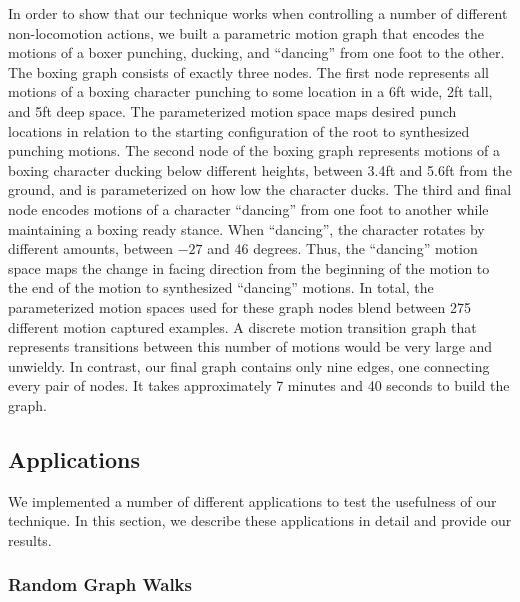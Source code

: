 \documentclass[10pt,twocolumn]{article}
\begin{document}
In order to show that our technique works when controlling a number of different non-locomotion actions, we built a parametric motion graph that encodes the motions of a boxer punching, ducking, and ``dancing'' from one foot to the other. The boxing graph consists of exactly three nodes. The first node represents all motions of a boxing character punching to some location in a 6ft wide, 2ft tall, and 5ft deep space. The parameterized motion space maps desired punch locations in relation to the starting configuration of the root to synthesized punching motions. The second node of the boxing graph represents motions of a boxing character ducking below different heights, between 3.4ft and 5.6ft from the ground, and is parameterized on how low the character ducks. The third and final node encodes motions of a character ``dancing'' from one foot to another while maintaining a boxing ready stance. When ``dancing'', the character rotates by different amounts, between $-27$ and $46$ degrees. Thus, the ``dancing'' motion space maps the change in facing direction from the beginning of the motion to the end of the motion to synthesized ``dancing'' motions. In total, the parameterized motion spaces used for these graph nodes blend between 275 different motion captured examples. A discrete motion transition graph that represents transitions between this number of motions would be very large and unwieldy. In contrast, our final graph contains only nine edges, one connecting every pair of nodes. It takes approximately 7 minutes and 40 seconds to build the graph.

\subsection{Applications}

We implemented a number of different applications to test the usefulness of our technique. In this section, we describe these applications in detail and provide our results.

\subsubsection{Random Graph Walks}
\end{document}
